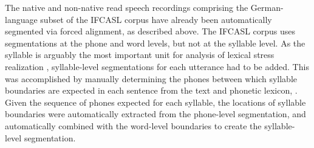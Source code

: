	The native and non-native read speech recordings comprising the German-language subset of the IFCASL corpus \citep{Fauth2014,Trouvain2013} have already been automatically segmented via forced alignment, as described above.
	The IFCASL corpus uses segmentations at the phone and word levels, 
	but not at the syllable level.
	As the syllable is arguably the most important unit for analysis of lexical stress realization , syllable-level segmentations for each utterance had to be added. This was accomplished by 
	 manually determining the phones between which syllable boundaries are expected in each sentence from the text and phonetic lexicon, 
	.
	 Given the sequence of phones expected for each syllable, the locations of syllable boundaries were automatically extracted from the phone-level segmentation, and automatically combined with the word-level boundaries to create the syllable-level segmentation. 
	

	
%	
%

